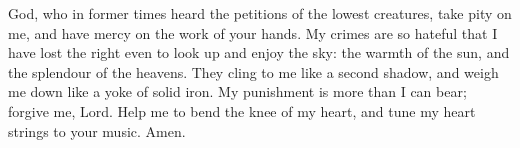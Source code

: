 God, who in former times heard the petitions of the lowest creatures, take pity on me, and have mercy on the work of your hands. My crimes are so hateful that I have lost the right even to look up and enjoy the sky: the warmth of the sun, and the splendour of the heavens. They cling to me like a second shadow, and weigh me down like a yoke of solid iron. My punishment is more than I can bear; forgive me, Lord. Help me to bend the knee of my heart, and tune my heart strings to your music. Amen.
